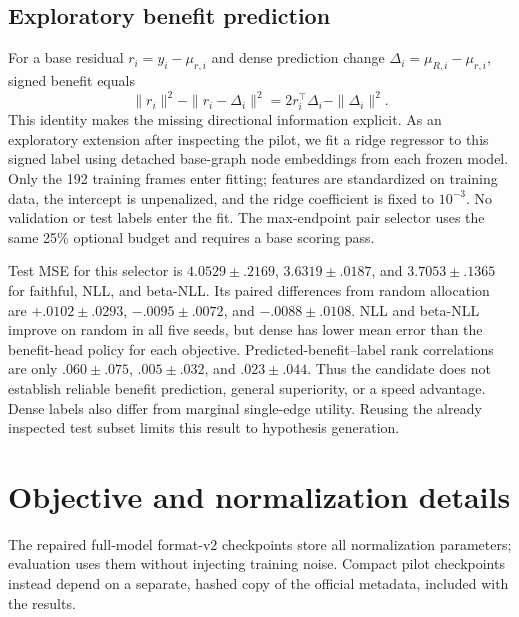 \subsection{Exploratory benefit prediction}
For a base residual $r_i=y_i-\mu_{r,i}$ and dense prediction change $\Delta_i=\mu_{R,i}-\mu_{r,i}$, signed benefit equals
\begin{equation}
 \|r_i\|^2-\|r_i-\Delta_i\|^2
 =2r_i^\top\Delta_i-\|\Delta_i\|^2.
\end{equation}
This identity makes the missing directional information explicit. As an exploratory extension after inspecting the pilot, we fit a ridge regressor to this signed label using detached base-graph node embeddings from each frozen model. Only the 192 training frames enter fitting; features are standardized on training data, the intercept is unpenalized, and the ridge coefficient is fixed to $10^{-3}$. No validation or test labels enter the fit. The max-endpoint pair selector uses the same 25\% optional budget and requires a base scoring pass.

Test MSE for this selector is $4.0529\pm.2169$, $3.6319\pm.0187$, and $3.7053\pm.1365$ for faithful, NLL, and beta-NLL. Its paired differences from random allocation are $+.0102\pm.0293$, $-.0095\pm.0072$, and $-.0088\pm.0108$. NLL and beta-NLL improve on random in all five seeds, but dense has lower mean error than the benefit-head policy for each objective. Predicted-benefit--label rank correlations are only $.060\pm.075$, $.005\pm.032$, and $.023\pm.044$. Thus the candidate does not establish reliable benefit prediction, general superiority, or a speed advantage. Dense labels also differ from marginal single-edge utility. Reusing the already inspected test subset limits this result to hypothesis generation.




\section{Objective and normalization details}
\label{sec:implementation-details}
The repaired full-model format-v2 checkpoints store all normalization parameters; evaluation uses them without injecting training noise. Compact pilot checkpoints instead depend on a separate, hashed copy of the official metadata, included with the results.

